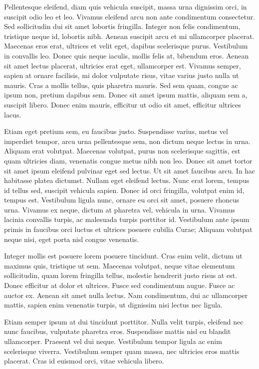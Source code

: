 \documentclass[runningheads,a4paper]{llncs}
\begin{document}
Pellentesque eleifend, diam quis vehicula suscipit, massa urna dignissim orci, in suscipit odio leo et leo. Vivamus eleifend arcu non ante condimentum consectetur. Sed sollicitudin dui sit amet lobortis fringilla. Integer non felis condimentum, tristique neque id, lobortis nibh. Aenean suscipit arcu et mi ullamcorper placerat. Maecenas eros erat, ultrices et velit eget, dapibus scelerisque purus. Vestibulum in convallis leo. Donec quis neque iaculis, mollis felis at, bibendum eros. Aenean sit amet lectus placerat, ultricies erat eget, ullamcorper est. Vivamus semper, sapien at ornare facilisis, mi dolor vulputate risus, vitae varius justo nulla ut mauris. Cras a mollis tellus, quis pharetra mauris. Sed sem quam, congue ac ipsum non, pretium dapibus sem. Donec sit amet ipsum mattis, aliquam sem a, suscipit libero. Donec enim mauris, efficitur ut odio sit amet, efficitur ultrices lacus.

Etiam eget pretium sem, eu faucibus justo. Suspendisse varius, metus vel imperdiet tempor, arcu urna pellentesque sem, non dictum neque lectus in urna. Aliquam erat volutpat. Maecenas volutpat, purus non scelerisque sagittis, est quam ultricies diam, venenatis congue metus nibh non leo. Donec sit amet tortor sit amet ipsum eleifend pulvinar eget sed lectus. Ut sit amet faucibus arcu. In hac habitasse platea dictumst. Nullam eget eleifend lectus. Nunc erat lorem, tempus id tellus sed, suscipit vehicula sapien. Donec id orci fringilla, volutpat enim id, tempus est. Vestibulum ligula nunc, ornare eu orci sit amet, posuere rhoncus urna. Vivamus ex neque, dictum at pharetra vel, vehicula in urna. Vivamus lacinia convallis turpis, ac malesuada turpis porttitor id. Vestibulum ante ipsum primis in faucibus orci luctus et ultrices posuere cubilia Curae; Aliquam volutpat neque nisi, eget porta nisl congue venenatis.

Integer mollis est posuere lorem posuere tincidunt. Cras enim velit, dictum ut maximus quis, tristique ut sem. Maecenas volutpat, neque vitae elementum sollicitudin, quam lorem fringilla tellus, molestie hendrerit justo risus at est. Donec efficitur at dolor et ultrices. Fusce sed condimentum augue. Fusce ac auctor ex. Aenean sit amet nulla lectus. Nam condimentum, dui ac ullamcorper mattis, sapien enim venenatis turpis, ut dignissim nisi lectus nec ligula.

Etiam semper ipsum at dui tincidunt porttitor. Nulla velit turpis, eleifend nec nunc faucibus, vulputate pharetra eros. Suspendisse mattis nisl eu blandit ullamcorper. Praesent vel dui neque. Vestibulum tempor ligula ac enim scelerisque viverra. Vestibulum semper quam massa, nec ultricies eros mattis placerat. Cras id euismod orci, vitae vehicula libero.
\end{document}

